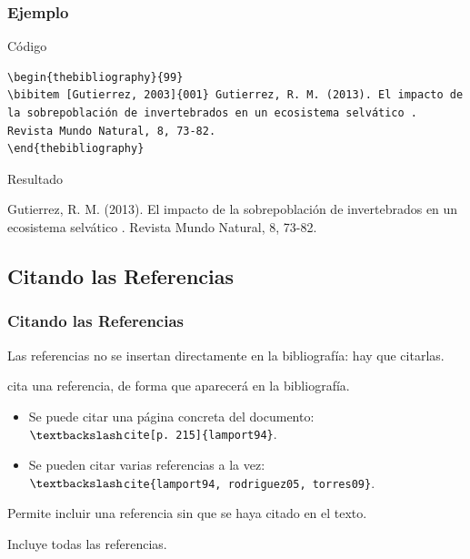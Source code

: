 \documentclass[aspectratio=43]{beamer}%
\begin{document}
\begin{frame}[fragile]
\frametitle{\textbf{Ejemplo}}
\justifying
 \begin{exampleblock}{Código}
   \vspace{-0.8cm}
\begin{lstlisting}
\begin{thebibliography}{99}
\bibitem [Gutierrez, 2003]{001} Gutierrez, R. M. (2013). El impacto de la sobrepoblación de invertebrados en un ecosistema selvático . Revista Mundo Natural, 8, 73-82.
\end{thebibliography}  
\end{lstlisting}\vspace{-0.3cm}
\end{exampleblock}

\begin{block}{Resultado}
\begin{thebibliography}{99}
 Gutierrez, R. M. (2013). El impacto de la sobrepoblación de invertebrados en un ecosistema selvático . Revista Mundo Natural, 8, 73-82.
\end{thebibliography}
\end{block}


\end{frame}


\subsection{Citando las Referencias}
\begin{frame}[fragile]
\frametitle{\textbf{Citando las Referencias}}
\justifying
 Las referencias no se insertan directamente en la bibliografía: hay que citarlas.
 \begin{description}\justifying
  \item[\texttt{$\textbackslash$cite\{label\}}] cita una referencia, de forma que aparecerá en la bibliografía.
  \begin{itemize}\justifying
  \item Se puede citar una página concreta del documento:\\\texttt{$\textbackslash$cite[p. 215]\{lamport94\}}.
  \item Se pueden citar varias referencias a la vez:\\ \texttt{$\textbackslash$cite\{lamport94, rodriguez05, torres09\}}.
\end{itemize}
\item [\texttt{$\textbackslash$nocite\{label\}}] Permite incluir una referencia sin que se haya citado en el texto.
\item [\texttt{$\textbackslash$nocite\{*\}}] Incluye todas las referencias.
\end{description}

\end{frame}
\end{document}
